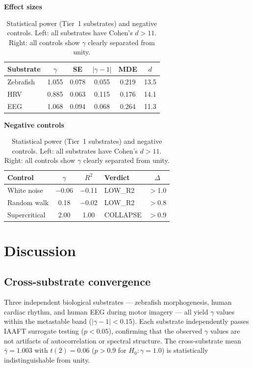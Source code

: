 \documentclass[11pt,a4paper,twocolumn]{article}
\begin{document}
\begin{table}[!tp]
\centering
\caption{Statistical power (Tier~1 substrates) and negative controls. Left: all substrates have Cohen's $d > 11$. Right: all controls show $\gamma$ clearly separated from unity.}
\label{tab:power_controls}
\small
\begin{minipage}[t]{0.48\textwidth}
\centering
\textbf{Effect sizes}\\[0.3em]
\begin{tabular}{@{}l c c c c c@{}}
\toprule
\textbf{Substrate} & $\gamma$ & SE & $|\gamma\!-\!1|$ & MDE & $d$ \\
\midrule
Zebrafish & 1.055 & 0.078 & 0.055 & 0.219 & 13.5 \\
HRV & 0.885 & 0.063 & 0.115 & 0.176 & 14.1 \\
EEG & 1.068 & 0.094 & 0.068 & 0.264 & 11.3 \\
\bottomrule
\end{tabular}
\end{minipage}%
\hfill
\begin{minipage}[t]{0.48\textwidth}
\centering
\textbf{Negative controls}\\[0.3em]
\begin{tabular}{@{}l c c l c@{}}
\toprule
\textbf{Control} & $\gamma$ & $R^2$ & \textbf{Verdict} & $\Delta$ \\
\midrule
White noise & $-$0.06 & $-$0.11 & LOW\_R2 & $>$1.0 \\
Random walk & 0.18 & $-$0.02 & LOW\_R2 & $>$0.8 \\
Supercritical & 2.00 & 1.00 & COLLAPSE & $>$0.9 \\
\bottomrule
\end{tabular}
\end{minipage}
\end{table}

\section{Discussion}

\subsection{Cross-substrate convergence}

Three independent biological substrates --- zebrafish morphogenesis, human cardiac rhythm, and human EEG during motor imagery --- all yield $\gamma$ values within the metastable band ($|\gamma - 1| < 0.15$). Each substrate independently passes IAAFT surrogate testing ($p < 0.05$), confirming that the observed $\gamma$ values are not artifacts of autocorrelation or spectral structure. The cross-substrate mean $\bar{\gamma} = 1.003$ with $t(2) = 0.06$ ($p > 0.9$ for $H_0\!: \gamma = 1.0$) is statistically indistinguishable from unity.
\end{document}
